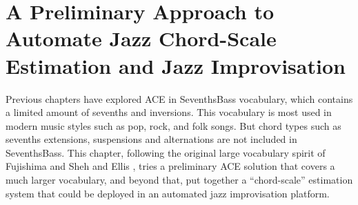 

\chapter{A Preliminary Approach to Automate Jazz Chord-Scale Estimation and Jazz Improvisation}\label{cp:jazz} %



\ifpdf
    \graphicspath{{8/figures/PNG/}{8/figures/PDF/}{8/figures/}}
\else
    \graphicspath{{8/figures/EPS/}{8/figures/}}
\fi

Previous chapters have explored ACE in SeventhsBass vocabulary, which contains a limited amount of sevenths and inversions. This vocabulary is most used in modern music styles such as pop, rock, and folk songs. But chord types such as sevenths extensions, suspensions and alternations are not included in SeventhsBass. This chapter, following the original large vocabulary spirit of Fujishima \cite{fujishima1999realtime} and Sheh and Ellis \cite{sheh2003chord}, tries a preliminary ACE solution that covers a much larger vocabulary, and beyond that, put together a ``chord-scale'' estimation system that could be deployed in an automated jazz improvisation platform.

